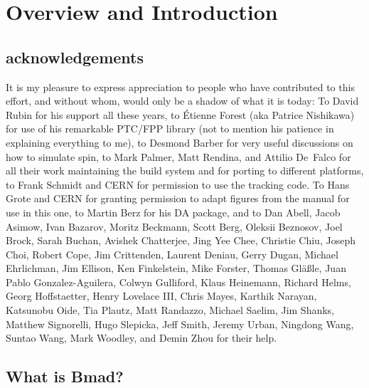 \chapter{Overview and Introduction}

\section{acknowledgements}

It is my pleasure to express appreciation to people who have contributed to this effort, and without
whom, \bmad would only be a shadow of what it is today: To David Rubin for his support all these
years, to \'Etienne Forest (aka Patrice Nishikawa) for use of his remarkable PTC/FPP library (not to
mention his patience in explaining everything to me), to Desmond Barber for very useful discussions
on how to simulate spin, to Mark Palmer, Matt Rendina, and Attilio De~Falco for all their work
maintaining the build system and for porting \bmad to different platforms, to Frank Schmidt and CERN
for permission to use the \mad tracking code. To Hans Grote and CERN for granting permission to
adapt figures from the \mad manual for use in this one, to Martin Berz for his DA package, and to
Dan Abell, Jacob Asimow, Ivan Bazarov, Moritz Beckmann, Scott Berg, Oleksii Beznosov, Joel Brock,
Sarah Buchan, Avishek Chatterjee, Jing Yee Chee, Christie Chiu, Joseph Choi, Robert Cope, Jim
Crittenden, Laurent Deniau, Gerry Dugan, Michael Ehrlichman, Jim Ellison, Ken Finkelstein, Mike
Forster, Thomas Gl{\"a}{\ss}le, Juan Pablo Gonzalez-Aguilera, Colwyn Gulliford, Klaus Heinemann,
Richard Helms, Georg Hoffstaetter, Henry Lovelace III, Chris Mayes, Karthik Narayan, Katsunobu Oide,
Tia Plautz, Matt Randazzo, Michael Saelim, Jim Shanks, Matthew Signorelli, Hugo Slepicka, Jeff
Smith, Jeremy Urban, Ningdong Wang, Suntao Wang, Mark Woodley, and Demin Zhou for their help.

\section{What is Bmad?}

